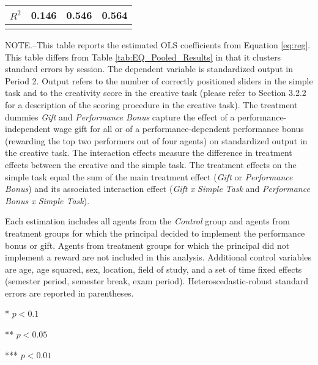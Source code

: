 \begin{table}[h]
\begin{center}
{\begin{tabular}{lccc}
$R^2$               &       0.146         &       0.546         &       0.564         \\
\hline\noalign{\medskip}
\end{tabular}
\begin{minipage}{\textwidth} \setlength{\parindent}{15pt}
\footnotesize NOTE.--This table reports the estimated OLS coefficients from Equation \ref{eq:reg}. This table differs from Table \ref{tab:EQ_Pooled_Results} in that it clusters standard errors by session.
The dependent variable is standardized output in Period 2. Output refers to the number of correctly positioned sliders in the simple task and to the creativity score in the creative task (please refer to Section 3.2.2 for a description of the scoring procedure in the creative task). 
The treatment dummies \textit{Gift} and \textit{Performance Bonus} capture the effect of a performance-independent wage gift for all or of a performance-dependent performance bonus (rewarding the top two performers out of four agents) on standardized output in the creative task. 
The interaction effects measure the difference in treatment effects between the creative and the simple task. The treatment effects on the simple task equal the sum of the main treatment effect (\textit{Gift} or \textit{Performance Bonus}) and its associated interaction effect (\textit{Gift x Simple Task} and \textit{Performance Bonus x Simple Task}). 

Each estimation includes all agents from the \textit{Control} group and agents from treatment groups for which the principal decided to implement the performance bonus or gift. Agents from treatment groups for which the principal did not implement a reward are not included in this analysis. 
Additional control variables are age, age squared, sex, location, field of study, and a set of time fixed effects (semester period, semester break, exam period). 
Heteroscedastic-robust standard errors are reported in parentheses. 

*   $ p < 0.1  $

**  $ p < 0.05 $

*** $ p < 0.01 $
\end{minipage}}
\end{center}
\label{tab:EQ_Pooled_Results_Cluster_Session}
\end{table}
